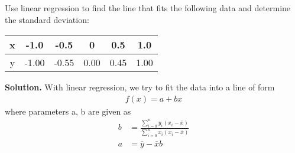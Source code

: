 \begin{exercise}{3} %
Use linear regression to find the line that fits the following data and determine the standard deviation:\\
\begin{table}[h]
\centering
\begin{tabular}{|c|c|c|c|c|c|}
\hline
x & -1.0 & -0.5 & 0 & 0.5 & 1.0 \\ \hline
y & -1.00 & -0.55 & 0.00 & 0.45 & 1.00 \\ \hline
\end{tabular}
\end{table}

\textbf{Solution.} With linear regression, we try to fit the data into a line of form
\begin{align}
f(x)=a+bx
\end{align}
where parameters a, b are given as
\begin{align}
b&=\frac{\sum\limits_{i=0}^{n} y_i(x_i-\overline{x})}{\sum\limits_{i=0}^{n} x_i(x_i-\overline{x})}\\
a&=\overline{y}-\overline{x}b
\end{align}


\end{exercise}
